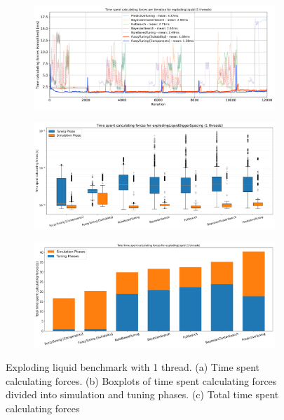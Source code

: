 \begin{figure}[H]
    \centering

    \begin{subfigure}[c]{\textwidth}
        \includegraphics[width=\columnwidth,trim={0cm 0 0cm 0.9cm},clip]{figures/Benchmark/ExplodingLiquid/timing_explodingLiquid_1.png}
        \caption{}
        \label{fig:explodingTimings_1thread}
    \end{subfigure}


    \begin{subfigure}[c]{\textwidth}
        \includegraphics[width=\columnwidth,trim={0cm 0 0cm 1cm},clip]{figures/Benchmark/ExplodingLiquid/boxplot_explodingLiquid_1.png}
        \caption{}
        \label{fig:explodingLiquidBoxplot_1thread}
    \end{subfigure}

    \begin{subfigure}[b]{\textwidth}
        \includegraphics[width=\columnwidth,trim={0cm 0 0cm 0.9cm},clip]{figures/Benchmark/ExplodingLiquid/total_time_explodingLiquid_1.png}
        \caption{}
        \label{fig:explodingLiquidTotalTime_1thread}
    \end{subfigure}


    \caption[Exploding liquid benchmark with 1 thread]{Exploding liquid benchmark with 1 thread. (a) Time spent calculating forces. (b) Boxplots of time spent calculating forces divided into simulation and tuning phases. (c) Total time spent calculating forces}
    \label{fig:explodingLiquid_1thread}
\end{figure}

